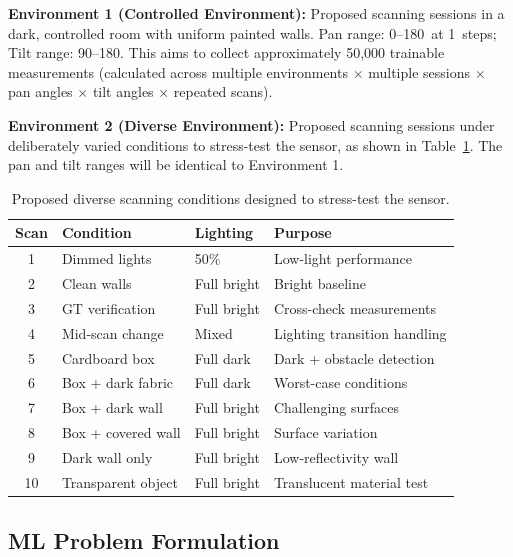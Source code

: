 \documentclass[12pt,a4paper]{article}
\begin{document}
    \textbf{Environment 1 (Controlled Environment):} Proposed scanning sessions in a dark, controlled room with uniform painted walls. Pan range: 0\textdegree--180\textdegree~at 1\textdegree~steps; Tilt range: 90\textdegree--180\textdegree. This aims to collect approximately 50,000 trainable measurements (calculated across multiple environments $\times$ multiple sessions $\times$ pan angles $\times$ tilt angles $\times$ repeated scans).

    \textbf{Environment 2 (Diverse Environment):} Proposed scanning sessions under deliberately varied conditions to stress-test the sensor, as shown in Table~\ref{tab:day2_conditions}. The pan and tilt ranges will be identical to Environment 1.

    \begin{table}[H]
    \centering
    \caption{Proposed diverse scanning conditions designed to stress-test the sensor.}
    \label{tab:day2_conditions}
    \small
    \begin{tabularx}{\textwidth}{|c|p{1.2in}|p{0.8in}|X|}
    \hline
    \textbf{Scan} & \textbf{Condition} & \textbf{Lighting} & \textbf{Purpose} \\
    \hline
    1 & Dimmed lights & 50\% & Low-light performance \\
    \hline
    2 & Clean walls & Full bright & Bright baseline \\
    \hline
    3 & GT verification & Full bright & Cross-check measurements \\
    \hline
    4 & Mid-scan change & Mixed & Lighting transition handling \\
    \hline
    5 & Cardboard box & Full dark & Dark + obstacle detection \\
    \hline
    6 & Box + dark fabric & Full dark & Worst-case conditions \\
    \hline
    7 & Box + dark wall & Full bright & Challenging surfaces \\
    \hline
    8 & Box + covered wall & Full bright & Surface variation \\
    \hline
    9 & Dark wall only & Full bright & Low-reflectivity wall \\
    \hline
    10 & Transparent object & Full bright & Translucent material test \\
    \hline
    \end{tabularx}
    \end{table}


    \subsection{ML Problem Formulation}
\end{document}

